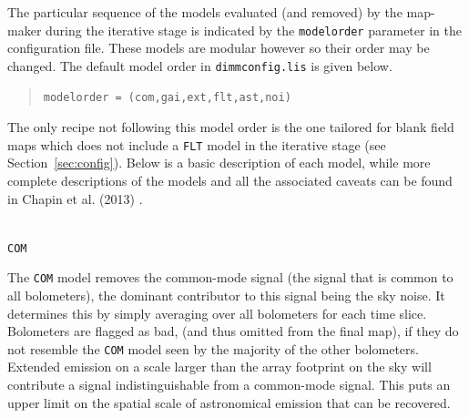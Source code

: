 \documentclass[twoside,11pt]{article}
\newcommand{\htmlref}[2]{#1}
\newcommand{\latexhtml}[2]{#1}
\renewcommand{\_}{\texttt{\symbol{95}}}
\newenvironment{myquote}{\begin{quote}\begin{small}}{\end{small}\end{quote}}
\newcommand{\cref}[3]{\latexhtml{#1~\ref{#2}}{\htmlref{#3}{#2}}}
\begin{document}
The particular sequence of the models evaluated (and removed) by the
map-maker during the iterative stage is indicated by the
\texttt{modelorder} parameter in the configuration file. These models
are modular however so their order may be changed. The default model
order in \texttt{dimmconfig.lis} is given below.
\vspace{-0.1cm}
\begin{myquote}
\begin{verbatim}
modelorder = (com,gai,ext,flt,ast,noi)
\end{verbatim}
\end{myquote}
\vspace{-0.1cm}
The only recipe not following this model order is the one tailored for
blank field maps which does not include a \texttt{FLT} model in the
iterative stage (see \cref{Section}{sec:config}{Specialised
configuration files}). Below is a basic
description of each model, while more complete descriptions of the
models and all the associated caveats can be found in Chapin et al.
(2013) \cite{mapmaker}.
\\ \\
\begin{minipage}[t]{0.07\linewidth}
\texttt{COM}
\end{minipage}
\begin{minipage}[t]{0.92\linewidth}The \texttt{COM} model removes the
common-mode signal (the signal that is common to all bolometers), the
dominant contributor to this signal being the sky noise. It determines
this by simply averaging over all bolometers for each time slice.
Bolometers are flagged as bad, (and thus omitted from the final map), if
they do not resemble the \texttt{COM} model seen by the majority of the
other bolometers.
\newline Extended emission on a scale larger than the array footprint
on the sky will contribute a signal indistinguishable from a
common-mode signal. This puts an upper limit on the spatial scale of
astronomical emission that can be recovered. \\
\end{minipage}
\end{document}
